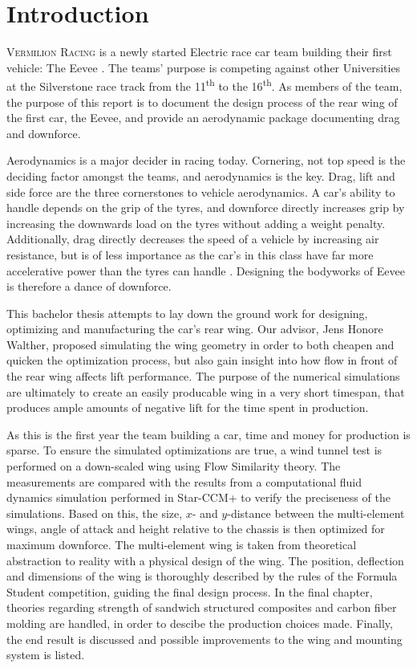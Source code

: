 \chapter{Introduction}
  \textsc{Vermilion Racing} is a newly started Electric race car team building their first vehicle: The Eevee \cite{bulba}. The teams' purpose is competing against other Universities at the Silverstone race track from the 11\textsuperscript{th} to the 16\textsuperscript{th}. As members of the team, the purpose of this report is to document the design process of the rear wing of the first car, the Eevee, and provide an aerodynamic package documenting drag and downforce.

  Aerodynamics is a major decider in racing today. Cornering, not top speed is the deciding factor amongst the teams, and aerodynamics is the key. Drag, lift and side force are the three cornerstones to vehicle aerodynamics. A car's ability to handle depends on the grip of the tyres, and downforce directly increases grip by increasing the downwards load on the tyres without adding a weight penalty. Additionally, drag directly decreases the speed of a vehicle by increasing air resistance, but is of less importance as the car's in this class have far more accelerative power than the tyres can handle \cite{jkatz}. Designing the bodyworks of Eevee is therefore a dance of downforce.

  This bachelor thesis attempts to lay down the ground work for designing, optimizing and manufacturing the car's rear wing. Our advisor, Jens Honore Walther, proposed simulating the wing geometry in order to both cheapen and quicken the optimization process, but also gain insight into how flow in front of the rear wing affects lift performance. The purpose of the numerical simulations are ultimately to create an easily producable wing in a very short timespan, that produces ample amounts of negative lift for the time spent in production. 

  As this is the first year the team building a car, time and money for production is sparse. To ensure the simulated optimizations are true, a wind tunnel test is performed on a down-scaled wing using Flow Similarity theory. The measurements are compared with the results from a computational fluid dynamics simulation performed in Star-CCM+ to verify the preciseness of the simulations. Based on this, the size, $x$- and $y$-distance between the multi-element wings, angle of attack and height relative to the chassis is then optimized for maximum downforce. The multi-element wing is taken from theoretical abstraction to reality with a physical design of the wing. The position, deflection and dimensions of the wing is thoroughly described by the rules of the Formula Student competition, guiding the final design process. In the final chapter, theories regarding strength of sandwich structured composites and carbon fiber molding are handled, in order to descibe the production choices made. Finally, the end result is discussed and possible improvements to the wing and mounting system is listed.

